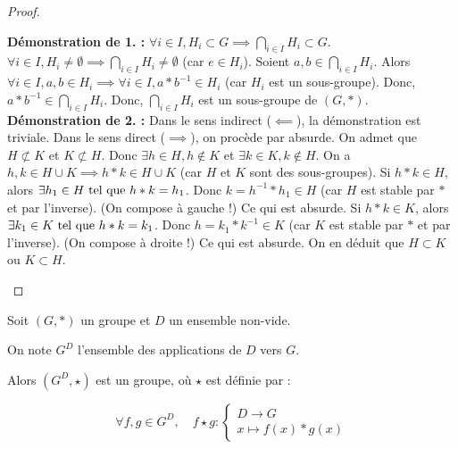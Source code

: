 \documentclass[12pt,a4paper]{report}
\begin{document}
\begin{proof}
    \begin{outline}
        \1 \textbf{Démonstration de 1. :}
        \2 $\forall i \in I, H_i \subset G \implies \bigcap_{i\in I} H_i \subset G$.
        \2 $\forall i \in I, H_i \ne \emptyset \implies \bigcap_{i\in I} H_i \ne \emptyset$ (car $e \in H_i$).
        \2 Soient $a,b \in \bigcap_{i\in I} H_i$.
        \2 Alors $\forall i \in I, a,b \in H_i \implies \forall i \in I, a*b^{-1} \in H_i$ (car $H_i$ est un sous-groupe).
        \2 Donc, $a*b^{-1} \in \bigcap_{i\in I} H_i$.
        \2 Donc, $\bigcap_{i\in I} H_i$ est un sous-groupe de $(G,*)$.
        \1 \textbf{Démonstration de 2. :}
        \2 Dans le sens indirect ($\impliedby$), la démonstration est triviale.
        \2 Dans le sens direct ($\implies$), on procède par absurde. On admet que $H \not\subset K$ et $K \not\subset H$.
        \2 Donc $\exists h \in H, h \notin K$ et $\exists k \in K, k \notin H$.
        \2 On a $h,k\in H\cup K \implies h*k \in H \cup K$ (car $H$ et $K$ sont des sous-groupes).
        \2 Si $h*k \in H$, alors $\exists h_1 \in H \text{ tel que } h*k = h_1$.
        \3 Donc $k=h^{-1}*h_1 \in H$ (car $H$ est stable par $*$ et par l'inverse). (On compose à gauche !)
        \3 Ce qui est absurde.
        \2 Si $h*k \in K$, alors $\exists k_1 \in K \text{ tel que } h*k = k_1$.
        \3 Donc $h = k_1 * k^{-1} \in K$ (car $K$ est stable par $*$ et par l'inverse). (On compose à droite !)
        \3 Ce qui est absurde.
        \2 On en déduit que $H \subset K$ ou $K \subset H$.
    \end{outline}
\end{proof}

\begin{property}
    Soit $(G,*)$ un groupe et $D$ un ensemble non-vide.

    On note $G^D$ l'ensemble des applications de $D$ vers $G$.

    Alors $(G^D, \star)$ est un groupe, où $\star$ est définie par :

    $$\forall f,g \in G^D, \quad f \star g : \begin{cases}D \to G\\x \mapsto f(x) * g(x)\end{cases}$$
\end{property}
\end{document}
